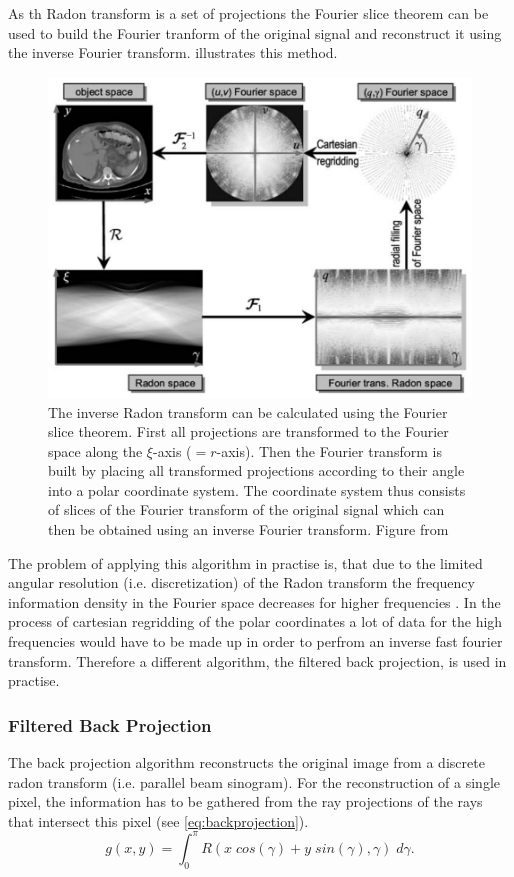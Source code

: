 \documentclass[10pt,journal,compsoc]{IEEEtran}
\begin{document}
As th Radon transform is a set of projections the Fourier slice theorem can be used to build the Fourier tranform of the original signal and reconstruct it using the inverse Fourier transform.
 illustrates this method.
%
\begin{figure}[!h]
\centering
\includegraphics[width=\linewidth]{img/inverseradon.png}
\caption{
The inverse Radon transform can be calculated using the Fourier slice theorem.
First all projections are transformed to the Fourier space along the $\xi$-axis ($=r$-axis).
Then the Fourier transform is built by placing all transformed projections according to their angle into a polar coordinate system.
The coordinate system thus consists of slices of the Fourier transform of the original signal which can then
be obtained using an inverse Fourier transform.
Figure from \cite{Buzug2008_chap5}
}
\label{fig:inverseradon}
\end{figure}
%
The problem of applying this algorithm in practise is, that due to the limited angular resolution (i.e. discretization) of the Radon transform the frequency information density in the Fourier space decreases for higher frequencies \cite{Buzug2008_chap5}.
In the process of cartesian regridding of the polar coordinates a lot of data for the high frequencies would have to be made up in order to perfrom an inverse fast fourier transform.
Therefore a different algorithm, the filtered back projection, is used in practise.

\subsubsection{Filtered Back Projection}
The back projection algorithm reconstructs the original image from a discrete radon transform (i.e. parallel beam sinogram).
For the reconstruction of a single pixel, the information has to be gathered from the ray projections of the rays that intersect this pixel (see \cref{eq:backprojection}).
\begin{equation}
\label{eq:backprojection}
g(x,y) = \int_0^\pi R(x\;cos(\gamma)+y\;sin(\gamma),\gamma)\;d\gamma. 
\end{equation}
\end{document}
